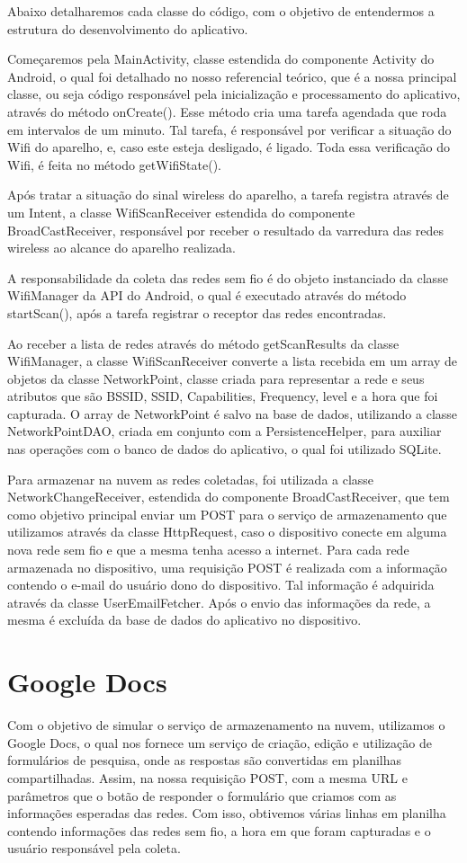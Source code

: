 \documentclass[12pt, %
openright, 
oneside,
a4paper,
brazil]{facom-ufu-abntex2}
\begin{document}
Abaixo detalharemos cada classe do código, com o objetivo de entendermos a estrutura do desenvolvimento do aplicativo.

Começaremos pela MainActivity, classe estendida do componente Activity do Android, o qual foi detalhado no nosso referencial teórico, que é a nossa principal classe, ou seja código responsável pela inicialização e processamento do aplicativo, através do método onCreate(). Esse método cria uma tarefa agendada que roda em intervalos de um minuto. Tal tarefa, é responsável por verificar a situação do Wifi do aparelho, e, caso este esteja desligado, é ligado. Toda essa verificação do Wifi, é feita no método getWifiState().

  Após tratar a situação do sinal wireless do aparelho, a tarefa registra através de um Intent, a classe WifiScanReceiver estendida do componente BroadCastReceiver, responsável por receber o resultado da varredura das redes wireless ao alcance do aparelho realizada.
 
 A responsabilidade da coleta das redes sem fio é do objeto instanciado da classe WifiManager da API do Android, o qual é executado através do método startScan(), após a tarefa registrar o receptor das redes encontradas.
 
  Ao receber a lista de redes através do método getScanResults da classe WifiManager, a classe WifiScanReceiver converte a lista recebida em um array de objetos da classe NetworkPoint, classe criada para representar a rede e seus atributos que são BSSID, SSID, Capabilities, Frequency, level e a hora que foi capturada. O array de NetworkPoint é salvo na base de dados, utilizando a classe NetworkPointDAO, criada em conjunto com a PersistenceHelper, para auxiliar nas operações com o banco de dados do aplicativo, o qual foi utilizado SQLite.
 
  Para armazenar na nuvem as redes coletadas, foi utilizada a classe NetworkChangeReceiver, estendida do componente BroadCastReceiver, que tem como objetivo principal enviar um POST para o serviço de armazenamento que utilizamos através da classe HttpRequest, caso o dispositivo conecte em alguma nova rede sem fio e que a mesma tenha acesso a internet. Para cada rede armazenada no dispositivo, uma requisição POST é realizada com a informação contendo o e-mail do usuário dono do dispositivo. Tal informação é adquirida através da classe UserEmailFetcher.  Após o envio das informações da rede, a mesma é excluída da base de dados do aplicativo no dispositivo.
  

 \section{Google Docs}
Com o objetivo de simular o serviço de armazenamento na nuvem, utilizamos o Google Docs, o qual nos fornece um serviço de criação, edição e utilização de formulários de pesquisa, onde as respostas são convertidas em planilhas compartilhadas. Assim, na nossa requisição POST, com a mesma URL e parâmetros que o botão de responder o formulário que criamos com as informações esperadas das redes. Com isso, obtivemos várias linhas em planilha contendo informações das redes sem fio, a hora em que foram capturadas e o usuário responsável pela coleta.
\end{document}
